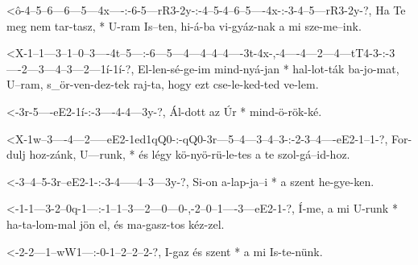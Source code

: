   {<ô-4--5--6---6---5---4x----:-6-5---rR3-2y-:-4--5-4--6--5----4x-:-3-4--5---rR3-2y-?,}
  {   Ha Te meg nem tar-tasz, * U-ram Is--ten, hi-á-ba vi-gyáz-nak  a mi sze-me--ink.}




  {<X-1--1---3--1--0--3----4t--5---:-6---5---4---4--4--4----3t-4x-,-4----4---2---4---tT4-3-:-3----2---3---4--3---2---1í-1í-?,}
  {   El-len-sé-ge-im mind-nyá-jan * hal-lot-ták ba-jo-mat, U--ram, s_ör-ven-dez-tek raj-ta, hogy ezt cse-le-ked-ted ve-lem.}

  {<-3r-5----eE2-1í-:-3----4-4---3y-?,}
  {  Ál-dott az  Úr * mind-ö-rök-ké.}

  {<X-1w--3----4---2-----eE2-1ed1qQ0-:-qQ0-3r---5--4---3--4--3-:-2-3--4----eE2-1--1-?,}
  {   For-dulj hoz-zánk, U---runk,   * és  légy kö-nyö-rü-le-tes a te szol-gá--id-hoz.}



  {<-3--4--5-3r--eE2-1-:-3-4-----4--3---3y-?,}
  {  Si-on a-lap-ja--i * a szent he-gye-ken.}

  {<-1-1---3-2--0q-1---:-1--1--3---2---0---0-,-2--0--1----3---eE2-1-?,}
  {  Í-me, a mi U-runk * ha-ta-lom-mal jön el, és ma-gasz-tos kéz-zel.}


  {<-2-2---1--wW1---:-0-1--2--2--2-?,}
  {  I-gaz és szent * a mi Is-te-nünk.}


